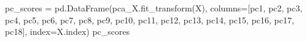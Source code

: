 \documentclass[
  11pt,
  letterpaper,
  DIV=11,
  numbers=noendperiod]{scrartcl}
\newenvironment{Shaded}{\begin{snugshade}}{\end{snugshade}}
\newcommand{\NormalTok}[1]{\textcolor[rgb]{0.00,0.23,0.31}{#1}}
\newcommand{\OperatorTok}[1]{\textcolor[rgb]{0.37,0.37,0.37}{#1}}
\newcommand{\StringTok}[1]{\textcolor[rgb]{0.13,0.47,0.30}{#1}}
\begin{document}
\begin{Shaded}
\begin{Highlighting}[]
\NormalTok{pc\_scores }\OperatorTok{=}\NormalTok{ pd.DataFrame(pca\_X.fit\_transform(X), columns}\OperatorTok{=}\NormalTok{[}\StringTok{\textquotesingle{}pc1\textquotesingle{}}\NormalTok{, }\StringTok{\textquotesingle{}pc2\textquotesingle{}}\NormalTok{, }\StringTok{\textquotesingle{}pc3\textquotesingle{}}\NormalTok{, }\StringTok{\textquotesingle{}pc4\textquotesingle{}}\NormalTok{, }\StringTok{\textquotesingle{}pc5\textquotesingle{}}\NormalTok{, }\StringTok{\textquotesingle{}pc6\textquotesingle{}}\NormalTok{, }\StringTok{\textquotesingle{}pc7\textquotesingle{}}\NormalTok{, }\StringTok{\textquotesingle{}pc8\textquotesingle{}}\NormalTok{, }\StringTok{\textquotesingle{}pc9\textquotesingle{}}\NormalTok{, }\StringTok{\textquotesingle{}pc10\textquotesingle{}}\NormalTok{,}
            \StringTok{\textquotesingle{}pc11\textquotesingle{}}\NormalTok{, }\StringTok{\textquotesingle{}pc12\textquotesingle{}}\NormalTok{, }\StringTok{\textquotesingle{}pc13\textquotesingle{}}\NormalTok{, }\StringTok{\textquotesingle{}pc14\textquotesingle{}}\NormalTok{, }\StringTok{\textquotesingle{}pc15\textquotesingle{}}\NormalTok{, }\StringTok{\textquotesingle{}pc16\textquotesingle{}}\NormalTok{, }\StringTok{\textquotesingle{}pc17\textquotesingle{}}\NormalTok{, }\StringTok{\textquotesingle{}pc18\textquotesingle{}}\NormalTok{], index}\OperatorTok{=}\NormalTok{X.index)}
\NormalTok{pc\_scores}
\end{Highlighting}
\end{Shaded}
\end{document}
